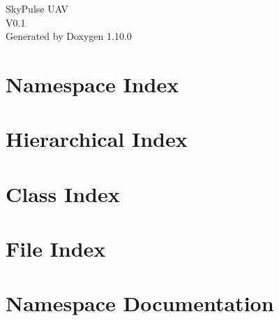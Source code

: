 \documentclass[twoside]{book}
\newcommand{\+}{\discretionary{\mbox{\scriptsize$\hookleftarrow$}}{}{}}
\newcommand{\clearemptydoublepage}{%
    \newpage{\pagestyle{empty}\cleardoublepage}%
  }
\begin{document}
  \raggedbottom
    \hypersetup{pageanchor=false,
                bookmarksnumbered=true,
                pdfencoding=unicode
               }
  \begin{titlepage}
  \vspace*{7cm}
  \begin{center}%
  {\Large Sky\+Pulse UAV}\\
  [1ex]\large V0.\+1 \\
  \vspace*{1cm}
  {\large Generated by Doxygen 1.10.0}\\
  \end{center}
  \end{titlepage}
  \clearemptydoublepage
  \tableofcontents
  \clearemptydoublepage
  \hypersetup{pageanchor=true}



\chapter{Namespace Index}

\chapter{Hierarchical Index}

\chapter{Class Index}

\chapter{File Index}

\chapter{Namespace Documentation}

\end{document}
